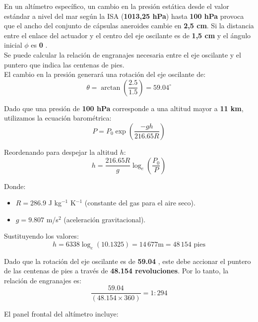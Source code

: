 \begin{example}

En un altímetro específico, un cambio en la presión estática desde el valor estándar a nivel del mar según la ISA (\textbf{1013,25 hPa}) hasta \textbf{100 hPa} provoca que el ancho del conjunto de cápsulas aneroides cambie en \textbf{2,5 cm}. Si la distancia entre el enlace del actuador y el centro del eje oscilante es de \textbf{1,5 cm} y el ángulo inicial \(\phi\) es \textbf{0 \textdegree}.\\

Se puede calcular la relación de engranajes necesaria entre el eje oscilante y el puntero que indica las centenas de pies.\\

El cambio en la presión generará una rotación del eje oscilante de:
\[
\theta = \arctan\left(\frac{2.5}{1.5}\right) = 59.04^\circ
\]

Dado que una presión de \textbf{100 hPa} corresponde a una altitud mayor a \textbf{11 km}, utilizamos la ecuación barométrica:
\[
P = P_0 \exp\left(\frac{-gh}{216.65R}\right)
\]

Reordenando para despejar la altitud \(h\):
\[
h = \frac{216.65R}{g} \log_e \left(\frac{P_0}{P}\right)
\]

Donde:
\begin{itemize}
    \item \( R = 286.9 \) J kg\(^{-1}\) K\(^{-1}\) (constante del gas para el aire seco).
    \item \( g = 9.807 \) m/s\(^{2}\) (aceleración gravitacional).
\end{itemize}

Sustituyendo los valores:
\[
h = 6338 \log_e(10.1325) = 14\,677 \text{m} = 48\,154 \text{ pies}
\]

Dado que la rotación del eje oscilante es de \textbf{59.04 \textdegree}, este debe accionar el puntero de las centenas de pies a través de \textbf{48.154 revoluciones}. Por lo tanto, la relación de engranajes es:
\[
\frac{59.04}{\left(48.154 \times 360\right)} = 1:294
\]
\end{example}

El panel frontal del altímetro incluye:\\

